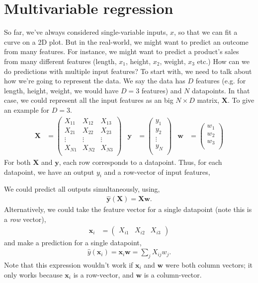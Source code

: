 \documentclass{article}
\newcommand{\yh}{\hat{y}}
\newcommand{\x}{\mathbf{x}}
\newcommand{\y}{\mathbf{y}}
\newcommand{\X}{\mathbf{X}}
\newcommand{\w}{\mathbf{w}}
\begin{document}
\section{Multivariable regression}
\label{sec:multi}

So far, we've always considered single-variable inputs, $x$, so that we can fit a curve on a 2D plot.
But in the real-world, we might want to predict an outcome from many features.
For instance, we might want to predict a product's sales from many different features (length, $x_1$, height, $x_2$, weight, $x_3$ etc.)
How can we do predictions with multiple input features?
To start with, we need to talk about how we're going to represent the data.
We say the data has $D$ features (e.g. for length, height, weight, we would have $D=3$ features) and $N$ datapoints. 
In that case, we could represent all the input features as an big $N \times D$ matrix, $\X$.
To give an example for $D = 3$.
\begin{align}
  \X &= \begin{pmatrix}
    X_{11} & X_{12} & X_{13}\\
    X_{21} & X_{22} & X_{23}\\
    \vdots & \vdots & \vdots\\
    X_{N1} & X_{N2} & X_{N3}\\
  \end{pmatrix}
  & 
  \y &= \begin{pmatrix}
    y_1\\
    y_2\\
    \vdots \\
    y_N\\
  \end{pmatrix} &
  \w &= \begin{pmatrix}
    w_1\\
    w_2\\
    w_3\\
  \end{pmatrix}
\end{align}
For both $\X$ and $\y$, each row corresponds to a datapoint. 
Thus, for each datapoint, we have an output $y_i$ and a row-vector of input features,

We could predict all outputs simultaneously, using,
\begin{align}
  \mathbf{\yh}(\X) = \X \w.
\end{align}
Alternatively, we could take the feature vector for a single datapoint (note this is a \textit{row} vector),
\begin{align}
  \x_i &= \begin{pmatrix} X_{i1} & X_{i2} & X_{i3} \end{pmatrix}
\end{align}
and make a prediction for a single datapoint,
\begin{align}
  \yh(\x_i) = \x_i \w = \sum_j X_{ij} w_j.
\end{align}
Note that this expression wouldn't work if $\x_i$ and $\w$ were both column vectors; it only works because $\x_i$ is a row-vector, and $\w$ is a column-vector.
\end{document}
